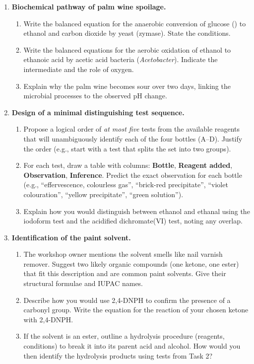 \documentclass[11pt]{article}
\begin{document}
\begin{enumerate}
    \item \textbf{Biochemical pathway of palm wine spoilage.}
    \begin{enumerate}
        \item Write the balanced equation for the anaerobic conversion of glucose () to ethanol and carbon dioxide by yeast (zymase). State the conditions.
        \item Write the balanced equations for the aerobic oxidation of ethanol to ethanoic acid by acetic acid bacteria (\emph{Acetobacter}). Indicate the intermediate and the role of oxygen.
        \item Explain why the palm wine becomes sour over two days, linking the microbial processes to the observed pH change.
    \end{enumerate}

    \item \textbf{Design of a minimal distinguishing test sequence.}
    \begin{enumerate}
        \item Propose a logical order of \emph{at most five} tests from the available reagents that will unambiguously identify each of the four bottles (A--D). Justify the order (e.g., start with a test that splits the set into two groups).
        \item For each test, draw a table with columns: \textbf{Bottle}, \textbf{Reagent added}, \textbf{Observation}, \textbf{Inference}. Predict the exact observation for each bottle (e.g., ``effervescence, colourless gas'', ``brick-red precipitate'', ``violet colouration'', ``yellow precipitate'', ``green solution'').
        \item Explain how you would distinguish between ethanol and ethanal using the iodoform test and the acidified dichromate(VI) test, noting any overlap.
    \end{enumerate}

    \item \textbf{Identification of the paint solvent.}
    \begin{enumerate}
        \item The workshop owner mentions the solvent smells like nail varnish remover. Suggest two likely organic compounds (one ketone, one ester) that fit this description and are common paint solvents. Give their structural formulae and IUPAC names.
        \item Describe how you would use 2,4-DNPH to confirm the presence of a carbonyl group. Write the equation for the reaction of your chosen ketone with 2,4-DNPH.
        \item If the solvent is an ester, outline a hydrolysis procedure (reagents, conditions) to break it into its parent acid and alcohol. How would you then identify the hydrolysis products using tests from Task 2?
    \end{enumerate}


\end{enumerate}
\end{document}
